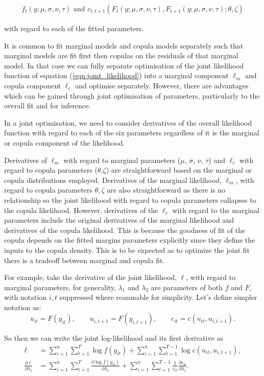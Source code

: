 \documentclass{article}
\begin{document}
\begin{align*}
    f_t(y;\mu,\sigma,\nu,\tau)\text{ and } c_{t,t+1}(F_t(y;\mu,\sigma,\nu,\tau),F_{t+1}(y;\mu,\sigma,\nu,\tau);\theta,\zeta)
\end{align*}

with regard to each of the fitted parameters.

It is common to fit marginal models and copula models separately such that marginal models are fit first then copulas on the residuals of that marginal model. In that case we can fully separate optimisation of the joint likelihood function of equation (\ref{eqn:joint_likelihood}) into a marginal component $\ell_m$ and copula component $\ell_c$ and optimise separately. However, there are advantages which can be gained through joint optimisation of parameters, particularly to the overall fit and for inference.

In a joint optimisation, we need to consider derivatives of the overall likelihood function with regard to each of the six parameters regardless of it is the marginal or copula component of the likelihood. 

Derivatives of $\ell_m$ with regard to marginal parameters ($\mu$, $\sigma$, $\nu$, $\tau$) and $\ell_c$ with regard to copula parameters ($\theta$,$\zeta$) are straightforward based on the marginal or copula distributions employed. Derivatives of the marginal likelihood, $\ell_m$, with regard to copula parameters $\theta,\zeta$ are also straightforward as there is no relationship so the joint likelihood with regard to copula parameters collapses to the copula likelihood. However, derivatives of the $\ell_c$ with regard to the marginal parameters include the original derivatives of the marginal likelihood and derivatives of the copula likelihood. This is because the goodness of fit of the copula depends on the fitted margins parameters explicitly since they define the inputs to the copula density. This is to be expected as to optimize the joint fit there is a tradeoff between marginal and copula fit. 

For example, take the derivative of the joint likelihood, $\ell$, with regard to marginal parameters, for generality, $\lambda_1$ and $\lambda_2$ are parameters of both $f$ and $F$, with notation $i,t$ suppressed where reasonable for simplicity. Let's define simpler notation as:
\[
u_{it} = F(y_{it}),
\qquad
u_{i,t+1} = F(y_{i,t+1}),
\qquad
c_{it} = c(u_{it},u_{i,t+1}).
\]


So then we can write the joint log-likelihood and its first derivative as
\begin{align*}
\ell
&=
\sum_{i=1}^{n}\sum_{t=1}^{T}
\log f(y_{it})
+
\sum_{i=1}^{n}\sum_{t=1}^{T-1}
\log c\left(u_{it},u_{i,t+1}\right),
\\
\frac{\partial \ell}{\partial \lambda_1}
&=
\sum_{i=1}^{n}\sum_{t=1}^{T}
\frac{\partial \log f(y_{it})}{\partial \lambda_1}
+
\sum_{i=1}^{n}\sum_{t=1}^{T-1}
\frac{1}{c_{it}}
\frac{\partial c_{it}}{\partial \lambda_1}.
\end{align*}
\end{document}
